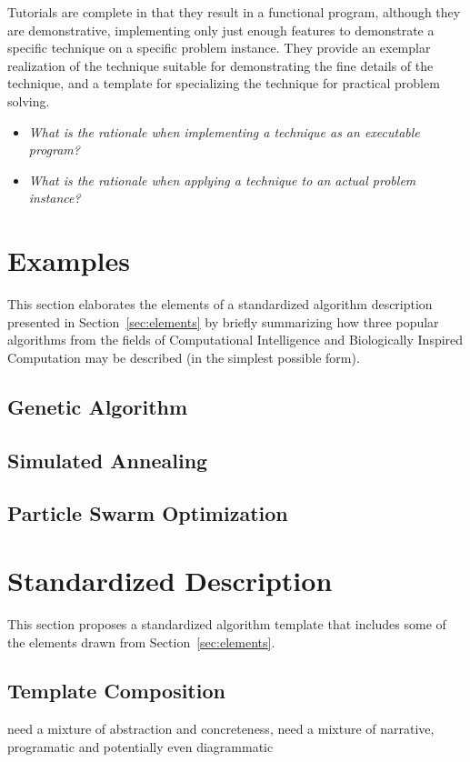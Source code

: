 \documentclass[a4paper, 11pt]{article}
\begin{document}
Tutorials are complete in that they result in a functional program, although they are demonstrative, implementing only just enough features to demonstrate a specific technique on a specific problem instance. They provide an exemplar realization of the technique suitable for demonstrating the fine details of the technique, and a template for specializing the technique for practical problem solving. 

\begin{itemize}
	\item \emph{What is the rationale when implementing a technique as an executable program?}
	\item \emph{What is the rationale when applying a technique to an actual problem instance?}
\end{itemize}

\section{Examples} 
\label{sec:examples}
This section elaborates the elements of a standardized algorithm description presented in Section~\ref{sec:elements} by briefly summarizing how three popular algorithms from the fields of Computational Intelligence and Biologically Inspired Computation may be described (in the simplest possible form).

\subsection{Genetic Algorithm}


\subsection{Simulated Annealing}


\subsection{Particle Swarm Optimization}


\section{Standardized Description} 
\label{sec:template}
This section proposes a standardized algorithm template that includes some of the elements drawn from Section~\ref{sec:elements}.

\subsection{Template Composition}
need a mixture of abstraction and concreteness, need a mixture of narrative, programatic and potentially even diagrammatic 
\end{document}
